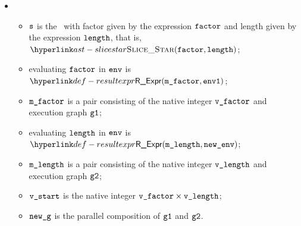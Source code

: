 \begin{itemize}
  \item {}
  \begin{itemize}
    \item $\vs$ is the \scaledslice\ with factor given by the
      expression $\efactor$ and length given by the
      expression $\elength$, that is, $\SliceStar(\efactor, \elength)$;
    \item evaluating $\efactor$ in $\env$ is $\ResultExpr(\mfactor, \envone)$\ProseOrAbnormal;
    \item $\mfactor$ is a pair consisting of the native integer $\vfactor$ and execution graph $\vgone$;
    \item evaluating $\elength$ in $\env$ is $\ResultExpr(\mlength, \newenv)$\ProseOrAbnormal;
    \item $\mlength$ is a pair consisting of the native integer $\vlength$ and execution graph $\vgtwo$;
    \item $\vstart$ is the native integer $\vfactor \times \vlength$;
    \item $\newg$ is the parallel composition of $\vgone$ and $\vgtwo$.
  \end{itemize}
\end{itemize}

\FormallyParagraph
\begin{mathpar}
\end{mathpar}

\begin{mathpar}
\end{mathpar}

